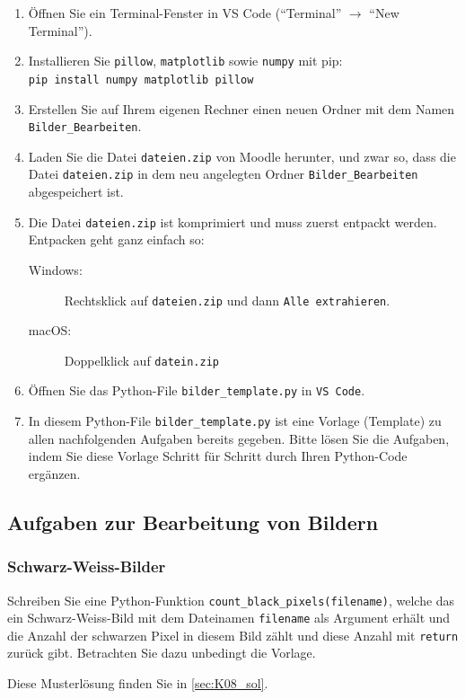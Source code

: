 \begin{enumerate}
	\item Öffnen Sie ein Terminal-Fenster in VS Code (\enquote{Terminal} $\rightarrow$ \enquote{New Terminal}).
    \item Installieren Sie \texttt{pillow}, \texttt{matplotlib} sowie \texttt{numpy} mit pip:\\
	\lstinline|pip install numpy matplotlib pillow|
	\item Erstellen Sie auf Ihrem eigenen Rechner einen neuen Ordner  mit dem Namen \texttt{Bilder\_Bearbeiten}.
	\item Laden Sie die Datei \texttt{dateien.zip} von Moodle herunter, und zwar so, dass die Datei \texttt{dateien.zip} in dem neu angelegten Ordner \texttt{Bilder\_Bearbeiten} abgespeichert ist.
	\item Die Datei \texttt{dateien.zip} ist komprimiert und muss zuerst entpackt werden. Entpacken geht ganz einfach so:
	      \begin{description}
		      \item[Windows:] Rechtsklick auf \texttt{dateien.zip} und dann \texttt{Alle extrahieren}.
		      \item[macOS:] Doppelklick auf \texttt{datein.zip}
	      \end{description}
	\item Öffnen Sie das Python-File \texttt{bilder\_template.py} in \texttt{VS Code}.
	\item In diesem Python-File \texttt{bilder\_template.py} ist eine Vorlage (Template) zu allen nachfolgenden Aufgaben bereits gegeben. Bitte lösen Sie die Aufgaben, indem Sie diese Vorlage Schritt für Schritt durch Ihren Python-Code ergänzen.
\end{enumerate}

\subsection{Aufgaben zur Bearbeitung von Bildern}
\subsubsection{Schwarz-Weiss-Bilder}
\begin{myexercise}
	Schreiben Sie eine Python-Funktion \lstinline|count_black_pixels(filename)|, welche das ein Schwarz-Weiss-Bild mit dem Dateinamen \lstinline|filename| als Argument erhält und die Anzahl der schwarzen Pixel in diesem Bild zählt und diese Anzahl mit \lstinline|return| zurück gibt. Betrachten Sie dazu unbedingt die Vorlage.
	\begin{myanswer}
		Diese Musterlösung finden Sie in \cref{sec:K08_sol}.
	\end{myanswer}
\end{myexercise}

